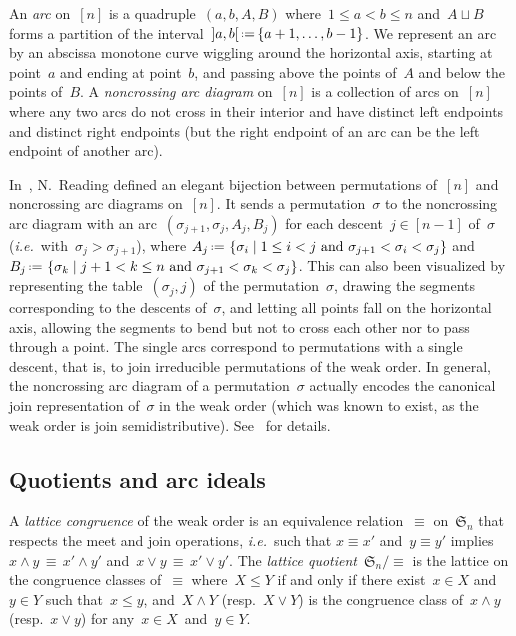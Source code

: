\documentclass{amsart}
\theoremstyle{definition}
\newcommand{\f}[1]{\mathfrak{#1}} %
\newcommand{\set}[2]{\left\{ #1 \;\middle|\; #2 \right\}} %
\newcommand{\eqdef}{\mbox{\,\raisebox{0.2ex}{\scriptsize\ensuremath{\mathrm:}}\ensuremath{=}\,}} %
\newcommand{\ie}{\textit{i.e.}~} %
\newcommand{\darkblue}{\color{darkblue}} %
\newcommand{\defn}[1]{\textsl{\darkblue #1}} %
\newcommand{\meet}{\wedge} %
\newcommand{\join}{\vee} %
\begin{document}
An \defn{arc} on~$[n]$ is a quadruple~$(a, b, A, B)$ where~$1 \le a < b \le n$ and~$A \sqcup B$ forms a partition of the interval~${]a,b[} \eqdef \{a+1, \dots, b-1\}$.
We represent an arc by an abscissa monotone curve wiggling around the horizontal axis, starting at point~$a$ and ending at point~$b$, and passing above the points of~$A$ and below the points of~$B$.
A \defn{noncrossing arc diagram} on~$[n]$ is a collection of arcs on~$[n]$ where any two arcs do not cross in their interior and have distinct left endpoints and distinct right endpoints (but the right endpoint of an arc can be the left endpoint of another arc).

In~\cite{Reading-arcDiagrams}, N.~Reading defined an elegant bijection between permutations of~$[n]$ and noncrossing arc diagrams on~$[n]$.
It sends a permutation~$\sigma$ to the noncrossing arc diagram with an arc~$(\sigma_{j+1}, \sigma_j, A_j, B_j)$ for each descent~$j \in [n-1]$ of~$\sigma$ (\ie with~$\sigma_j > \sigma_{j+1}$), where \linebreak $A_j \eqdef \set{\sigma_i}{1 \le i < j \text{ and } \sigma_{j+1} < \sigma_i < \sigma_j}$ and~$B_j \eqdef \set{\sigma_k}{j+1 < k \le n \text{ and } \sigma_{j+1} < \sigma_k < \sigma_j}$. \linebreak
This can also been visualized by representing the table~$(\sigma_j,j)$ of the permutation~$\sigma$, drawing the segments corresponding to the descents of~$\sigma$, and letting all points fall on the horizontal axis, allowing the segments to bend but not to cross each other nor to pass through a point.
The single arcs correspond to permutations with a single descent, that is, to join irreducible permutations of the weak order.
In general, the noncrossing arc diagram of a permutation~$\sigma$ actually encodes the canonical join representation of~$\sigma$ in the weak order (which was known to exist, as the weak order is join semidistributive).
See~\cite{Reading-arcDiagrams} for details.

\subsection{Quotients and arc ideals}

A \defn{lattice congruence} of the weak order is an equivalence relation~$\equiv$ on~$\f{S}_n$ that respects the meet and join operations, \ie such that $x \equiv x'$ and~$y \equiv y'$ implies $x \meet y \, \equiv \, x' \meet y'$ and~$x \join y \, \equiv \, x' \join y'$.
The \defn{lattice quotient}~$\f{S}_n/{\equiv}$ is the lattice on the congruence classes of~$\equiv$ where~$X \le Y$ if and only if there exist~$x \in X$ and~$y \in Y$ such that~$x \le y$, and~$X \meet Y$ (resp.~$X \join Y$) is the congruence class of~$x \meet y$ (resp.~$x \join y$) for any~$x \in X$~and~$y \in Y$.
\end{document}
